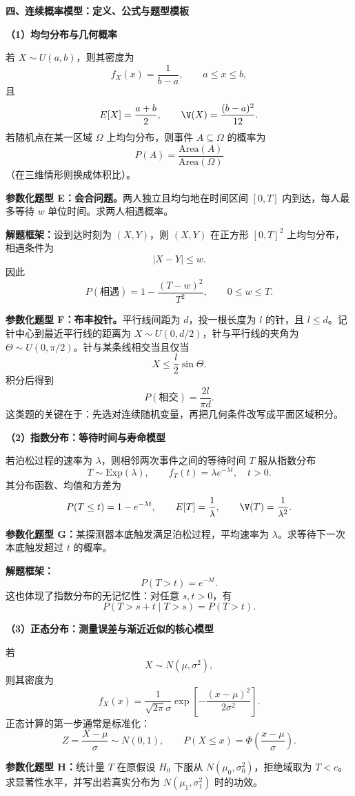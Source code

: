 \textbf{四、连续概率模型：定义、公式与题型模板}

\textbf{（1）均匀分布与几何概率}

若 $X\sim U(a,b)$，则其密度为
\[
f_X(x)=\frac{1}{b-a},\qquad a\le x\le b,
\]
且
\[
E[X]=\frac{a+b}{2},\qquad \V(X)=\frac{(b-a)^2}{12}.
\]
若随机点在某一区域 $\Omega$ 上均匀分布，则事件 $A\subseteq \Omega$ 的概率为
\[
P(A)=\frac{\text{Area}(A)}{\text{Area}(\Omega)}
\]
（在三维情形则换成体积比）。

\textbf{参数化题型 E：会合问题。}两人独立且均匀地在时间区间 $[0,T]$ 内到达，每人最多等待 $w$ 单位时间。求两人相遇概率。

\textbf{解题框架：}设到达时刻为 $(X,Y)$，则 $(X,Y)$ 在正方形 $[0,T]^2$ 上均匀分布，相遇条件为
\[
|X-Y|\le w.
\]
因此
\[
P(\text{相遇})=1-\frac{(T-w)^2}{T^2},\qquad 0\le w\le T.
\]

\textbf{参数化题型 F：布丰投针。}平行线间距为 $d$，投一根长度为 $l$ 的针，且 $l\le d$。记针中心到最近平行线的距离为 $X\sim U(0,d/2)$，针与平行线的夹角为 $\Theta\sim U(0,\pi/2)$。针与某条线相交当且仅当
\[
X\le \frac{l}{2}\sin\Theta.
\]
积分后得到
\[
P(\text{相交})=\frac{2l}{\pi d}.
\]
这类题的关键在于：先选对连续随机变量，再把几何条件改写成平面区域积分。

\textbf{（2）指数分布：等待时间与寿命模型}

若泊松过程的速率为 $\lambda$，则相邻两次事件之间的等待时间 $T$ 服从指数分布
\[
T\sim \mathrm{Exp}(\lambda),\qquad f_T(t)=\lambda e^{-\lambda t},\quad t>0.
\]
其分布函数、均值和方差为
\[
P(T\le t)=1-e^{-\lambda t},\qquad E[T]=\frac{1}{\lambda},\qquad \V(T)=\frac{1}{\lambda^2}.
\]

\textbf{参数化题型 G：}某探测器本底触发满足泊松过程，平均速率为 $\lambda$。求等待下一次本底触发超过 $t$ 的概率。

\textbf{解题框架：}
\[
P(T>t)=e^{-\lambda t}.
\]
这也体现了指数分布的无记忆性：对任意 $s,t>0$，有
\[
P(T>s+t\mid T>s)=P(T>t).
\]

\textbf{（3）正态分布：测量误差与渐近近似的核心模型}

若
\[
X\sim N(\mu,\sigma^2),
\]
则其密度为
\[
f_X(x)=\frac{1}{\sqrt{2\pi}\sigma}\exp\left[-\frac{(x-\mu)^2}{2\sigma^2}\right].
\]
正态计算的第一步通常是标准化：
\[
Z=\frac{X-\mu}{\sigma}\sim N(0,1),\qquad P(X\le x)=\Phi\!\left(\frac{x-\mu}{\sigma}\right).
\]

\textbf{参数化题型 H：}统计量 $T$ 在原假设 $H_0$ 下服从 $N(\mu_0,\sigma_0^2)$，拒绝域取为 $T<c$。求显著性水平，并写出若真实分布为 $N(\mu_1,\sigma_1^2)$ 时的功效。

